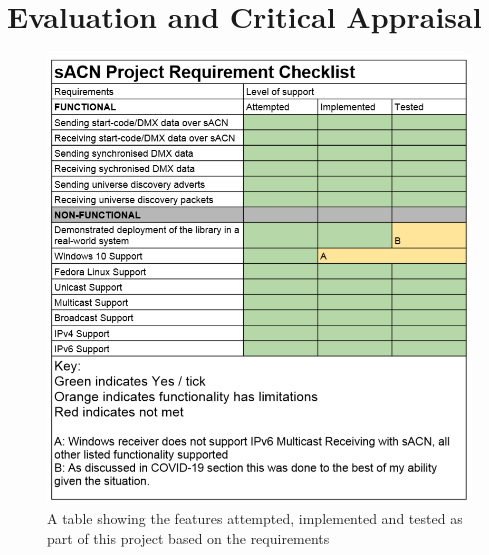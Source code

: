 \documentclass[11pt,a4paper]{article}
\begin{document}
\section{Evaluation and Critical Appraisal}
\begin{figure}[H]
	\includegraphics[width=\textwidth]{Project-Requirements-Checklist}
	\caption{A table showing the features attempted, implemented and tested as part of this project based on the requirements}
	\label{REQ_CHECKLIST}
\end{figure}
\end{document}
